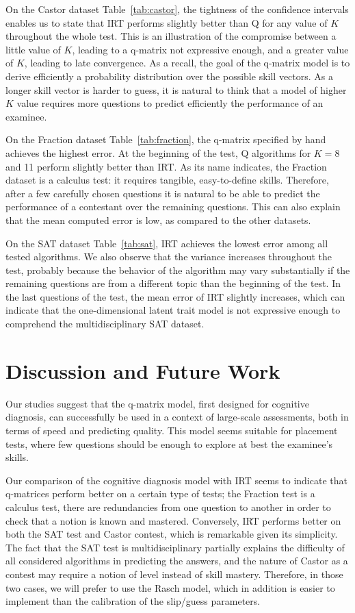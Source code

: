 \documentclass{edm_template}
\begin{document}
On the Castor dataset Table~\ref{tab:castor}, the tightness of the confidence intervals enables us to state that IRT performs slightly better than Q for any value of $K$ throughout the whole test. This is an illustration of the compromise between a little value of $K$, leading to a q-matrix not expressive enough, and a greater value of $K$, leading to late convergence. As a recall, the goal of the q-matrix model is to derive efficiently a probability distribution over the possible skill vectors. As a longer skill vector is harder to guess, it is natural to think that a model of higher $K$ value requires more questions to predict efficiently the performance of an examinee. %

On the Fraction dataset Table~\ref{tab:fraction}, the q-matrix specified by hand achieves the highest error. At the beginning of the test, Q algorithms for $K = 8$ and 11 perform slightly better than IRT. As its name indicates, the Fraction dataset is a calculus test: it requires tangible, easy-to-define skills. Therefore, after a few carefully chosen questions it is natural to be able to predict the performance of a contestant over the remaining questions. This can also explain that the mean computed error is low, as compared to the other datasets.

On the SAT dataset Table~\ref{tab:sat}, IRT achieves the lowest error among all tested algorithms. We also observe that the variance increases throughout the test, probably because the behavior of the algorithm may vary substantially if the remaining questions are from a different topic than the beginning of the test. In the last questions of the test, the mean error of IRT slightly increases, which can indicate that the one-dimensional latent trait model is not expressive enough to comprehend the multidisciplinary SAT dataset.

\section{Discussion and Future Work}

Our studies suggest that the q-matrix model, first designed for cognitive diagnosis, can successfully be used in a context of large-scale assessments, both in terms of speed and predicting quality. This model seems suitable for placement tests, where few questions should be enough to explore at best the examinee's skills.

Our comparison of the cognitive diagnosis model with IRT seems to indicate that q-matrices perform better on a certain type of tests; the Fraction test is a calculus test, there are redundancies from one question to another in order to check that a notion is known and mastered. Conversely, IRT performs better on both the SAT test and Castor contest, which is remarkable given its simplicity. The fact that the SAT test is multidisciplinary partially explains the difficulty of all considered algorithms in predicting the answers, and the nature of Castor as a contest may require a notion of level instead of skill mastery. Therefore, in those two cases, we will prefer to use the Rasch model, which in addition is easier to implement than the calibration of the slip/guess parameters.
\end{document}
